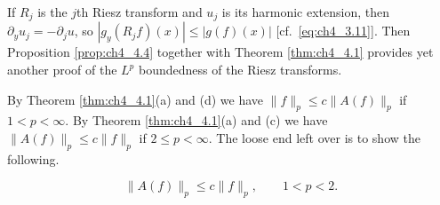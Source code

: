 If $R_j$ is the $j$th Riesz transform and $u_j$ is its harmonic extension, then $\partial_yu_j = -\partial_ju$, so $|g_y(R_jf)(x)| \leq |g(f)(x)|$ [cf.\ \eqref{eq:ch4_3.11}]. Then Proposition \ref{prop:ch4_4.4} together with Theorem \ref{thm:ch4_4.1} provides yet another proof of the $L^p$ boundedness of the Riesz transforms.


By Theorem \ref{thm:ch4_4.1}(a) and (d) we have $\|f\|_p \leq c\|A(f)\|_p$ if $1 < p < \infty$. By Theorem \ref{thm:ch4_4.1}(a) and (c) we have $\|A(f)\|_p \leq c\|f\|_p$ if $2 \leq p < \infty$. The loose end left over is to show the following.

\begin{proposition}\label{prop:ch4_4.5}
\[
    \|A(f)\|_p \leq c\|f\|_p, \qquad 1 < p < 2.
\]
\end{proposition}

